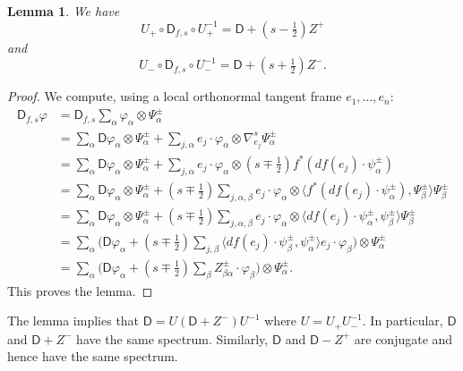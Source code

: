 \documentclass[11pt,reqno]{amsart}
\newcommand{\ns}{\nabla^s}
\newcommand{\D}{\mathsf{D}}
\renewcommand{\phi}{\varphi}
\newcommand{\<}{\langle}
\renewcommand{\>}{\rangle}
\newtheorem{lemma}{Lemma}
\theoremstyle{definition}
\begin{document}
\begin{lemma}\label{lem.DiracConjugate}
We have 
\begin{equation}
U_+ \circ \D_{f,s} \circ U_+^{-1} = \D + (s-\tfrac12)Z^+
\label{eq.DiracConjugate+}
\end{equation}
and 
\begin{equation}
U_- \circ \D_{f,s} \circ U_-^{-1} = \D + (s+\tfrac12)Z^- .
\label{eq.DiracConjugate-}
\end{equation}
\end{lemma}

\begin{proof}
We compute, using a local orthonormal tangent frame $e_1,\dots,e_n$:
\begin{align*}
\D_{f,s}\phi 
&=
\D_{f,s}\sum_\alpha \phi_\alpha \otimes \Psi_\alpha^\pm \\
&=
\sum_\alpha \D \phi_\alpha \otimes \Psi_\alpha^\pm + \sum_{j,\alpha} e_j\cdot \phi_\alpha \otimes \ns_{e_j}\Psi_\alpha^\pm \\
&=
\sum_\alpha \D \phi_\alpha \otimes \Psi_\alpha^\pm + \sum_{j,\alpha} e_j\cdot \phi_\alpha \otimes (s\mp\tfrac12)f^*(df(e_j)\cdot\psi_\alpha^\pm) \\
&=
\sum_\alpha \D \phi_\alpha \otimes \Psi_\alpha^\pm + (s\mp\tfrac12)\sum_{j,\alpha,\beta} e_j\cdot \phi_\alpha \otimes \<f^*(df(e_j)\cdot\psi_\alpha^\pm),\Psi_\beta^\pm\>\Psi_\beta^\pm \\
&=
\sum_\alpha \D \phi_\alpha \otimes \Psi_\alpha^\pm + (s\mp\tfrac12)\sum_{j,\alpha,\beta} e_j\cdot \phi_\alpha \otimes \<df(e_j)\cdot\psi_\alpha^\pm,\psi_\beta^\pm\>\Psi_\beta^\pm \\
&=
\sum_\alpha \Big(\D \phi_\alpha + (s\mp\tfrac12)\sum_{j,\beta} \<df(e_j)\cdot\psi_\beta^\pm,\psi_\alpha^\pm\>e_j\cdot \phi_\beta \Big)\otimes \Psi_\alpha^\pm \\
&=
\sum_\alpha \Big(\D \phi_\alpha + (s\mp\tfrac12)\sum_{\beta} Z_{\beta\alpha}^\pm\cdot \phi_\beta \Big)\otimes \Psi_\alpha^\pm .
\end{align*}
This proves the lemma.
\end{proof}

The lemma implies that $\D=U(\D+Z^-)U^{-1}$ where $U=U_+U_-^{-1}$.
In particular, $\D$ and $\D+Z^-$ have the same spectrum.
Similarly, $\D$ and $\D-Z^+$ are conjugate and hence have the same spectrum.

\end{document}
